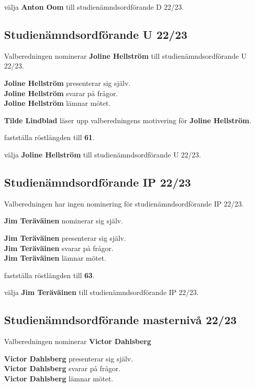 \documentclass[../protokoll_varmote_2022.tex]{subfiles}
\begin{document}
\motetbeslutar\att{} välja \textbf{Anton Oom} till studienämndsordförande D 22/23.





\subsection{Studienämndsordförande U 22/23}
Valberedningen nominerar \textbf{Joline Hellström} till studienämndsordförande U 22/23.

\textbf{Joline Hellström} presenterar sig själv. \\
\textbf{Joline Hellström} svarar på frågor. \\
\textbf{Joline Hellström} lämnar mötet.

\textbf{Tilde Lindblad} läser upp valberedningens motivering för \textbf{Joline Hellström}.

\motetbeslutar\att{} fastställa röstlängden till \textbf{61}.

\motetbeslutar\att{} välja \textbf{Joline Hellström} till studienämndsordförande U 22/23.


\subsection{Studienämndsordförande IP 22/23}
Valberedningen har ingen nominering för studienämndsordförande IP 22/23.

\textbf{Jim Teräväinen} nominerar sig själv.

\textbf{Jim Teräväinen} presenterar sig själv. \\
\textbf{Jim Teräväinen} svarar på frågor. \\
\textbf{Jim Teräväinen} lämnar mötet.

\motetbeslutar\att{} fastställa röstlängden till \textbf{63}.

\motetbeslutar\att{} välja \textbf{Jim Teräväinen} till studienämndsordförande IP 22/23.


\subsection{Studienämndsordförande masternivå 22/23}
Valberedningen nominerar \textbf{Victor Dahlsberg}

\textbf{Victor Dahlsberg} presenterar sig själv. \\
\textbf{Victor Dahlsberg} svarar på frågor. \\
\textbf{Victor Dahlsberg} lämnar mötet.
\end{document}
